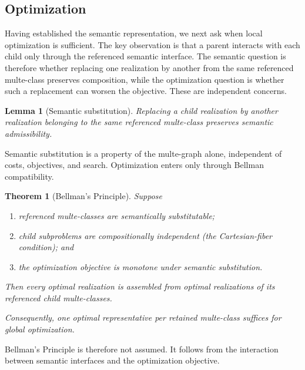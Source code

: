 \documentclass[sigconf,nonacm]{acmart}
\theoremstyle{definition}
\theoremstyle{plain}
\newtheorem{theorem}[definition]{Theorem}
\newtheorem{lemma}[definition]{Lemma}
\theoremstyle{remark}
\begin{document}
\subsection{Optimization}
\label{sec:optimization-theory}

Having established the semantic representation, we next ask when local
optimization is sufficient.  The key observation is that a parent
interacts with each child only through the referenced semantic
interface.  The semantic question is therefore whether replacing one
realization by another from the same referenced multe-class preserves
composition, while the optimization question is whether such a
replacement can worsen the objective.  These are independent concerns.

\begin{lemma}[Semantic substitution]
Replacing a child realization by another realization belonging to the
same referenced multe-class preserves semantic admissibility.
\end{lemma}

Semantic substitution is a property of the multe-graph alone,
independent of costs, objectives, and search.  Optimization enters only
through Bellman compatibility.

\begin{theorem}[Bellman's Principle]
Suppose

\begin{enumerate}

\item
referenced multe-classes are semantically substitutable;

\item
child subproblems are compositionally independent (the
Cartesian-fiber condition); and

\item
the optimization objective is monotone under semantic substitution.

\end{enumerate}

Then every optimal realization is assembled from optimal realizations
of its referenced child multe-classes.

Consequently, one optimal representative per retained multe-class
suffices for global optimization.
\end{theorem}

Bellman's Principle is therefore not assumed.  It follows from the
interaction between semantic interfaces and the optimization objective.
\end{document}
